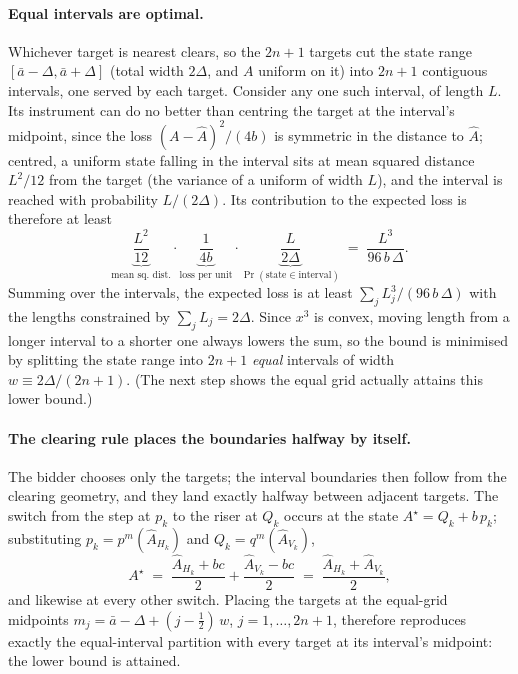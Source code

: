\documentclass[11pt,a4paper]{article}
\theoremstyle{definition}
\theoremstyle{remark}
\theoremstyle{plain}
\begin{document}
\paragraph{Equal intervals are optimal.} Whichever target is nearest clears, so the $2n+1$ targets cut the state range $[\bar a - \Delta, \bar a + \Delta]$ (total width $2\Delta$, and $A$ uniform on it) into $2n+1$ contiguous intervals, one served by each target. Consider any one such interval, of length $L$. Its instrument can do no better than centring the target at the interval's midpoint, since the loss $(A - \hat A)^2/(4b)$ is symmetric in the distance to $\hat A$; centred, a uniform state falling in the interval sits at mean squared distance $L^2/12$ from the target (the variance of a uniform of width $L$), and the interval is reached with probability $L/(2\Delta)$. Its contribution to the expected loss is therefore at least
\[
\underbrace{\frac{L^2}{12}}_{\text{mean sq.\ dist.}} \cdot \underbrace{\frac{1}{4 b}}_{\text{loss per unit}} \cdot \underbrace{\frac{L}{2\Delta}}_{\Pr(\text{state}\in\text{interval})} \;=\; \frac{L^3}{96\, b\, \Delta}.
\]
Summing over the intervals, the expected loss is at least $\sum_j L_j^3/(96\, b\, \Delta)$ with the lengths constrained by $\sum_j L_j = 2\Delta$. Since $x^3$ is convex, moving length from a longer interval to a shorter one always lowers the sum, so the bound is minimised by splitting the state range into $2n+1$ \emph{equal} intervals of width $w \equiv 2\Delta/(2n+1)$. (The next step shows the equal grid actually attains this lower bound.)

\paragraph{The clearing rule places the boundaries halfway by itself.} The bidder chooses only the targets; the interval boundaries then follow from the clearing geometry, and they land exactly halfway between adjacent targets. The switch from the step at $p_k$ to the riser at $Q_k$ occurs at the state $A^\star = Q_k + b\,p_k$; substituting $p_k = p^m(\hat A_{H_k})$ and $Q_k = q^m(\hat A_{V_k})$,
\[
A^\star \;=\; \frac{\hat A_{H_k} + bc}{2} + \frac{\hat A_{V_k} - bc}{2} \;=\; \frac{\hat A_{H_k} + \hat A_{V_k}}{2},
\]
and likewise at every other switch. Placing the targets at the equal-grid midpoints $m_j = \bar a - \Delta + (j - \tfrac12)\,w$, $j = 1, \dots, 2n+1$, therefore reproduces exactly the equal-interval partition with every target at its interval's midpoint: the lower bound is attained.
\end{document}
